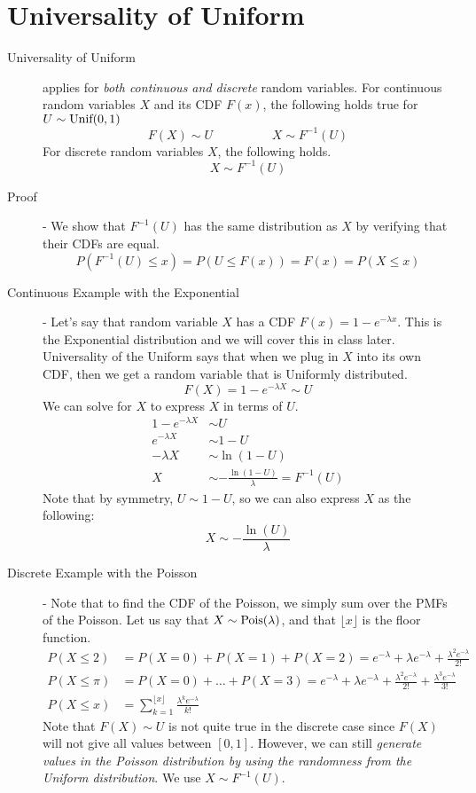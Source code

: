 \documentclass[11pt]{article}
\begin{document}
\pagebreak

\section*{Universality of Uniform}
\begin{description}
  \item[Universality of Uniform] applies for \emph{both continuous and discrete} random variables. For continuous random variables $X$ and its CDF $F(x)$, the following holds true for $U \sim \textrm{Unif}(0, 1)$ \[F(X) \sim U \hspace{2cm} X \sim F^{-1}(U)\]
For discrete random variables $X$, the following holds.
 \[X \sim F^{-1}(U)\]
  \item[Proof] - We show that $F^{-1}(U)$ has the same distribution as $X$ by verifying that their CDFs are equal.
    \[P(F^{-1}(U) \leq x) = P(U \leq F(x)) = F(x) = P(X \leq x)\]
  \item [Continuous Example with the Exponential] - Let's say that random variable $X$ has a CDF $F(x) = 1 - e^{-\lambda x}$. This is the Exponential distribution and we will cover this in class later. Universality of the Uniform says that when we plug in $X$ into its own CDF, then we get a random variable that is Uniformly distributed.
  \[F(X) = 1 - e^{-\lambda X} \sim U\]
  We can solve for $X$ to express $X$ in terms of $U$.
  \begin{align*}
    1 - e^{-\lambda X} &\sim U \\
    e^{-\lambda X} &\sim 1 - U \\
    -\lambda X &\sim \ln(1 - U) \\
    X &\sim -\frac{\ln(1 - U)}{\lambda} = F^{-1}(U)
  \end{align*}
  Note that by symmetry, $U \sim 1 - U$, so we can also express $X$ as the following:
  \[X \sim -\frac{\ln(U)}{\lambda}\]
  \item [Discrete Example with the Poisson] - Note that to find the CDF of the Poisson, we simply sum over the PMFs of the Poisson. Let us say that $X \sim \textrm{Pois}(\lambda)$, and that $\lfloor x \rfloor$ is the floor function.
  \begin{align*}
    P(X \leq 2) &= P(X = 0) + P(X = 1) + P(X = 2) = e^{-\lambda} +  \lambda e^{-\lambda} + \frac{\lambda^2 e^{-\lambda}}{2!}\\
    P(X \leq \pi) &= P(X = 0) + \dots + P(X = 3) = e^{-\lambda} +  \lambda e^{-\lambda} + \frac{\lambda^2 e^{-\lambda}}{2!} + \frac{\lambda^3 e^{-\lambda}}{3!}\\
    P(X \leq x) &= \sum_{k=1}^{\lfloor x \rfloor} \frac{\lambda^k e^{-\lambda}}{k!}
  \end{align*}
  Note that $F(X) \sim U$ is not quite true in the discrete case since $F(X)$ will not give all values between $[0, 1]$. However, we can still \emph{generate values in the Poisson distribution by using the randomness from the Uniform distribution}. We use $X \sim F^{-1}(U)$.


\end{description}
\end{document}
